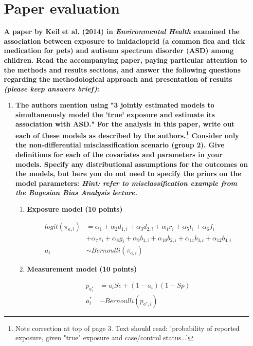 \documentclass[
  11pt,
]{article}
\begin{document}
\newpage

\section{Paper evaluation}

\textbf{A paper by Keil et al. (2014) in \textit{Environmental Health} examined the association between exposure to imidacloprid (a common flea and tick medication for pets) and autisum spectrum disorder (ASD) among children. Read the accompanying paper, paying particular attention to the methods and results sections, and answer the following questions regarding the methodological approach and presentation of results \textit{(please keep answers brief)}:}

\begin{enumerate}[label=\textbf{\arabic*.}]\addtocounter{enumi}{5}
  \item \textbf{The authors mention using "3 jointly estimated models to simultaneously model the 'true' exposure and estimate its association with ASD." For the analysis in this paper, write out each of these models as described by the authors.\footnote{Note correction at top of page 3. Text should read: ’probability of reported exposure, given "true" exposure and case/control status...’} Consider only the non-differential misclassification scenario (group 2). Give definitions for each of the covariates and parameters in your models. Specify any distributional assumptions for the outcomes on the models, but here you do not need to specify the priors on the model parameters: \textit{Hint: refer to misclassification example from the Bayesian Bias Analysis lecture.}}
  \begin{enumerate}[label=\textbf{\alph*.}]
    \item \textbf{Exposure model (10 points)}
    
\begin{align*}
logit(\pi_{a,i}) &= \alpha_1 + \alpha_2 d_{1,i} + \alpha_3 d_{2,i} + \alpha_4 r_i + \alpha_5 t_i + \alpha_6 f_i \\
  &+ \alpha_7 s_i + \alpha_8 g_i + \alpha_9 b_{1,i} + \alpha_{10} b_{2,i} + \alpha_{11} b_{3,i} + \alpha_{12} b_{4,i} \\
a_i &\sim Bernoulli(\pi_{a,i}) 
\end{align*}

    
    \item \textbf{Measurement model (10 points)}
    
\begin{align*}
p_{a_i^*} &= a_i Se + (1 - a_i)(1 - Sp) \\
a_i^* &\sim Bernoulli(p_{a^*,i})
\end{align*}


\end{enumerate}
\end{enumerate}
\end{document}
